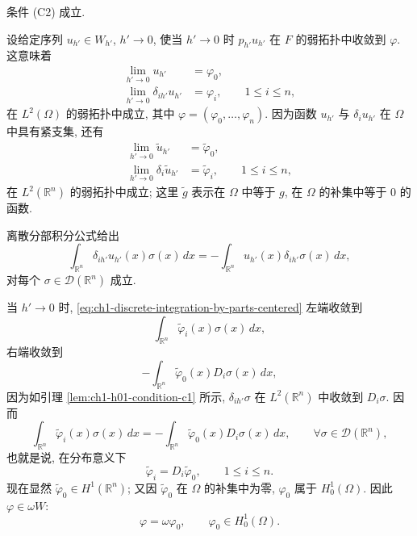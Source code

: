 \begin{Lemma}
\label{lem:ch1-h01-condition-c2}
条件 (C2) 成立.
\end{Lemma}

\begin{Proof}
设给定序列 $u_{h'}\in W_{h'}$, $h'\to0$, 使当 $h'\to0$ 时 $p_{h'}u_{h'}$ 在 $F$ 的弱拓扑中收敛到 $\varphi$. 这意味着
\begin{equation}
\begin{aligned}
\lim_{h'\to0}u_{h'}&=\varphi_0,\\
\lim_{h'\to0}\delta_{ih'}u_{h'}&=\varphi_i,\qquad1\leq i\leq n,
\end{aligned}
\label{eq:ch1-h01-weak-component-limits}
\end{equation}
在 $L^2(\Omega)$ 的弱拓扑中成立, 其中 $\varphi=(\varphi_0,\ldots,\varphi_n)$. 因为函数 $u_{h'}$ 与 $\delta_iu_{h'}$ 在 $\Omega$ 中具有紧支集, 还有
\begin{equation}
\begin{aligned}
\lim_{h'\to0}\widetilde u_{h'}&=\widetilde\varphi_0,\\
\lim_{h'\to0}\delta_i\widetilde u_{h'}&=\widetilde\varphi_i,\qquad1\leq i\leq n,
\end{aligned}
\label{eq:ch1-extended-weak-component-limits}
\end{equation}
在 $L^2(\mathbb R^n)$ 的弱拓扑中成立; 这里 $\widetilde g$ 表示在 $\Omega$ 中等于 $g$, 在 $\Omega$ 的补集中等于 $0$ 的函数.

离散分部积分公式给出
\begin{equation}
\int_{\mathbb R^n}\delta_{ih'}u_{h'}(x)\sigma(x)\,dx
=-\int_{\mathbb R^n}u_{h'}(x)\delta_{ih'}\sigma(x)\,dx,
\label{eq:ch1-discrete-integration-by-parts-centered}
\end{equation}
对每个 $\sigma\in\mathcal D(\mathbb R^n)$ 成立.

当 $h'\to0$ 时, \eqref{eq:ch1-discrete-integration-by-parts-centered} 左端收敛到
\[
\int_{\mathbb R^n}\widetilde\varphi_i(x)\sigma(x)\,dx,
\]
右端收敛到
\[
-\int_{\mathbb R^n}\widetilde\varphi_0(x)D_i\sigma(x)\,dx,
\]
因为如引理 \ref{lem:ch1-h01-condition-c1} 所示, $\delta_{ih'}\sigma$ 在 $L^2(\mathbb R^n)$ 中收敛到 $D_i\sigma$. 因而
\[
\int_{\mathbb R^n}\widetilde\varphi_i(x)\sigma(x)\,dx
=-\int_{\mathbb R^n}\widetilde\varphi_0(x)D_i\sigma(x)\,dx,
\qquad\forall\sigma\in\mathcal D(\mathbb R^n),
\]
也就是说, 在分布意义下
\begin{equation}
\widetilde\varphi_i=D_i\widetilde\varphi_0,\qquad1\leq i\leq n.
\label{eq:ch1-weak-limit-derivatives}
\end{equation}
现在显然 $\widetilde\varphi_0\in H^1(\mathbb R^n)$; 又因 $\widetilde\varphi_0$ 在 $\Omega$ 的补集中为零, $\varphi_0$ 属于 $H_0^1(\Omega)$. 因此 $\varphi\in\omega W$:
\begin{equation}
\varphi=\omega\varphi_0,\qquad\varphi_0\in H_0^1(\Omega).
\label{eq:ch1-h01-limit-in-embedding}
\end{equation}
\end{Proof}

